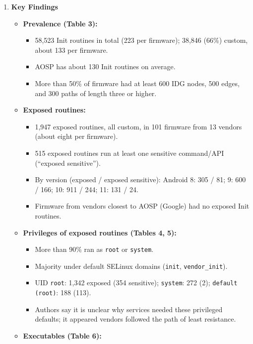 \documentclass[11pt,a4paper]{article}
\newcommand{\entrypart}[1]{\textbf{\color{accent}#1}\par\vspace{2pt}}
\begin{document}
\begin{enumerate}
    \item \entrypart{Key Findings}
    \begin{itemize}[leftmargin=*, itemsep=1pt, topsep=2pt]
        \item \textbf{Prevalence (Table 3):}
        \begin{itemize}[itemsep=0pt]
            \item 58,523 Init routines in total (223 per firmware); 38,846 (66\%) custom, about 133 per firmware.
            \item AOSP has about 130 Init routines on average.
            \item More than 50\% of firmware had at least 600 IDG nodes, 500 edges, and 300 paths of length three or higher.
        \end{itemize}
        \item \textbf{Exposed routines:}
        \begin{itemize}[itemsep=0pt]
            \item 1,947 exposed routines, all custom, in 101 firmware from 13 vendors (about eight per firmware).
            \item 515 exposed routines run at least one sensitive command/API (``exposed sensitive'').
            \item By version (exposed / exposed sensitive): Android 8: 305 / 81; 9: 600 / 166; 10: 911 / 244; 11: 131 / 24.
            \item Firmware from vendors closest to AOSP (Google) had no exposed Init routines.
        \end{itemize}
        \item \textbf{Privileges of exposed routines (Tables 4, 5):}
        \begin{itemize}[itemsep=0pt]
            \item More than 90\% ran as \texttt{root} or \texttt{system}.
            \item Majority under default SELinux domains (\texttt{init}, \texttt{vendor\_init}).
            \item UID \texttt{root}: 1,342 exposed (354 sensitive); \texttt{system}: 272 (2); \texttt{default (root)}: 188 (113).
            \item Authors say it is unclear why services needed these privileged defaults; it appeared vendors followed the path of least resistance.
        \end{itemize}
        \item \textbf{Executables (Table 6):}
        \begin{itemize}[itemsep=0pt]

\end{itemize}
\end{itemize}
\end{enumerate}
\end{document}
